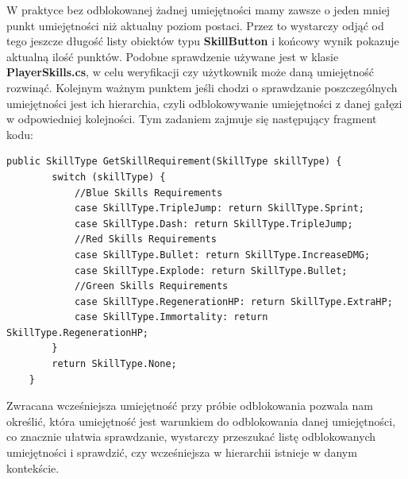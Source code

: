 \documentclass[oneside,polski,logo]{amuthesis}
\begin{document}
W praktyce bez odblokowanej żadnej umiejętności mamy zawsze o jeden mniej punkt umiejętności niż aktualny poziom postaci. Przez to wystarczy odjąć od tego jeszcze długość listy obiektów typu  \textbf{SkillButton} i końcowy wynik pokazuje aktualną ilość punktów. Podobne sprawdzenie używane jest w klasie \textbf{PlayerSkills.cs}, w celu weryfikacji czy użytkownik może daną umiejętność rozwinąć. Kolejnym ważnym punktem jeśli chodzi o sprawdzanie poszczególnych umiejętności jest ich hierarchia, czyli odblokowywanie umiejętności z danej gałęzi w odpowiedniej kolejności. Tym zadaniem zajmuje się następujący fragment kodu:
\newpage
\begin{lstlisting}[breaklines=true,
language={[Sharp]C},
rulecolor=\color{blue!80!black},
caption={Fragment klasy \texttt{PlayerSkills.cs}}
]    
    public SkillType GetSkillRequirement(SkillType skillType) {
        switch (skillType) {
            //Blue Skills Requirements
            case SkillType.TripleJump: return SkillType.Sprint;
            case SkillType.Dash: return SkillType.TripleJump;
            //Red Skills Requirements
            case SkillType.Bullet: return SkillType.IncreaseDMG;
            case SkillType.Explode: return SkillType.Bullet;
            //Green Skills Requirements
            case SkillType.RegenerationHP: return SkillType.ExtraHP;
            case SkillType.Immortality: return SkillType.RegenerationHP;
        }
        return SkillType.None;
    }
\end{lstlisting}

Zwracana wcześniejsza umiejętność przy próbie odblokowania pozwala nam określić, która umiejętność jest warunkiem do odblokowania danej umiejętności, co znacznie ułatwia sprawdzanie, wystarczy przeszukać listę odblokowanych umiejętności i sprawdzić, czy wcześniejsza w hierarchii istnieje w danym kontekście.
\end{document}
